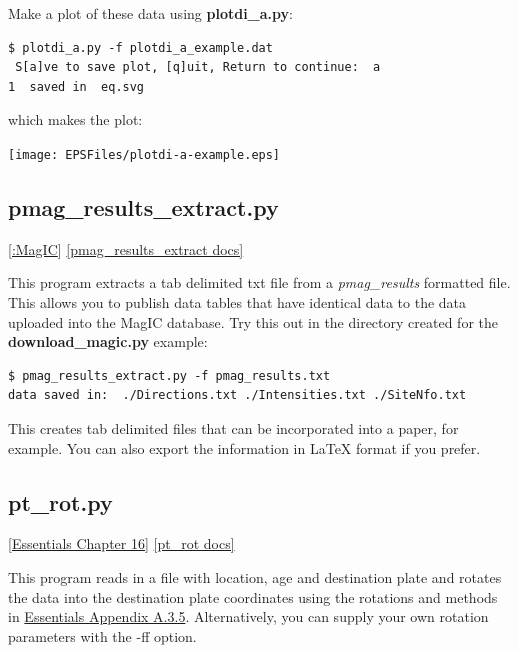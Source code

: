 \documentclass[11pt]{book}
\begin{document}
{{{{Make a plot of these data using {\bf plotdi\_a.py}:

\begin{verbatim}
$ plotdi_a.py -f plotdi_a_example.dat
 S[a]ve to save plot, [q]uit, Return to continue:  a
1  saved in  eq.svg
\end{verbatim}
\noindent  which makes the plot:


  \texttt{[image: EPSFiles/plotdi-a-example.eps]}


\subsection{pmag\_results\_extract.py}
\href{#MagiC}{[:MagIC}]
\href{https://github.com/PmagPy/PmagPy/blob/master/programs/pmag_results_extract.py}{[pmag\_results\_extract docs]}

This program extracts a tab delimited txt file from a {\it pmag\_results} formatted file.   This allows you to publish data tables that have identical data to the data uploaded into the MagIC database.    Try this out in the directory created for the {\bf download\_magic.py} example:

\begin{verbatim}
$ pmag_results_extract.py -f pmag_results.txt
data saved in:  ./Directions.txt ./Intensities.txt ./SiteNfo.txt
\end{verbatim}

This creates tab delimited files that can be incorporated into a paper, for example.   You can also export the information in LaTeX format if you prefer.





\subsection{pt\_rot.py}
\href{http://earthref.org/MAGIC/books/Tauxe/Essentials/WebBook3ch16.html#ch16}{[Essentials Chapter 16]}
\href{https://github.com/PmagPy/PmagPy/blob/master/programs/pt_rot.py}{[pt\_rot docs]}

This program reads in a file with location, age and destination plate and rotates the data into the destination plate coordinates using the rotations and methods in \href{http://earthref.org/MAGIC/books/Tauxe/Essentials/WebBook3ap1.html#polerot}{Essentials Appendix A.3.5}.  Alternatively, you can supply your own rotation parameters with the -ff option.

}}}}
\end{document}

